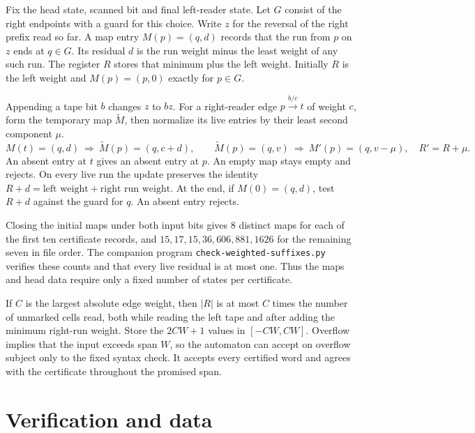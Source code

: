 \documentclass[11pt]{article}
\newcommand{\word}[1]{\texttt{#1}}
\begin{document}
Fix the head state, scanned bit and final left-reader state. Let \(G\) consist of the right endpoints with a guard for this choice. Write \(z\) for the reversal of the right prefix read so far. A map entry \(M(p)=(q,d)\) records that the run from \(p\) on \(z\) ends at \(q\in G\). Its residual \(d\) is the run weight minus the least weight of any such run. The register \(R\) stores that minimum plus the left weight. Initially \(R\) is the left weight and \(M(p)=(p,0)\) exactly for \(p\in G\).

Appending a tape bit \(b\) changes \(z\) to \(bz\). For a right-reader edge \(p\xrightarrow{b/c}t\) of weight \(c\), form the temporary map \(\widetilde M\), then normalize its live entries by their least second component \(\mu\).
\[
 M(t)=(q,d)\ \Longrightarrow\ \widetilde M(p)=(q,c+d),
 \qquad
 \widetilde M(p)=(q,v)\ \Longrightarrow\ M'(p)=(q,v-\mu),\quad R'=R+\mu .
\]
An absent entry at \(t\) gives an absent entry at \(p\). An empty map stays empty and rejects. On every live run the update preserves the identity \(R+d=\text{left weight}+\text{right run weight}\). At the end, if \(M(0)=(q,d)\), test \(R+d\) against the guard for \(q\). An absent entry rejects.

Closing the initial maps under both input bits gives 8 distinct maps for each of the first ten certificate records, and \(15,17,15,36,606,881,1626\) for the remaining seven in file order. The companion program \word{check-weighted-suffixes.py} verifies these counts and that every live residual is at most one. Thus the maps and head data require only a fixed number of states per certificate.

If \(C\) is the largest absolute edge weight, then \(|R|\) is at most \(C\) times the number of unmarked cells read, both while reading the left tape and after adding the minimum right-run weight. Store the \(2CW+1\) values in \([-CW,CW]\). Overflow implies that the input exceeds span \(W\), so the automaton can accept on overflow subject only to the fixed syntax check. It accepts every certified word and agrees with the certificate throughout the promised span.

\section*{Verification and data}
\end{document}

